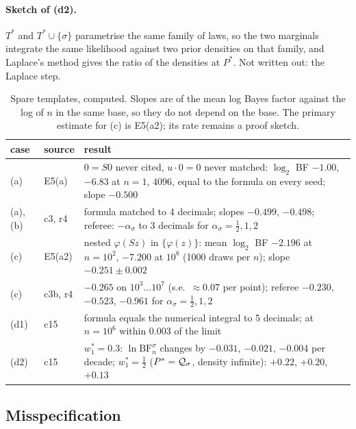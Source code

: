 \paragraph{Sketch of (d2).} $T^*$ and $T^*\cup\{\sigma\}$ parametrise the same family of laws, so the two marginals integrate the same likelihood against two prior densities on that family, and Laplace's method gives the ratio of the densities at $P^*$. Not written out: the Laplace step.

\begin{table}[ht]
\centering\small
\begin{tabular}{@{}llp{10.4cm}@{}}
\toprule
case & source & result\\
\midrule
(a) & E5(a) & $0=S0$ never cited, $u\cdot0=0$ never matched: $\log_2$ BF $-1.00$, $-6.83$ at $n=1$, $4096$, equal to the formula on every seed; slope $-0.500$\\
(a), (b) & c3, r4 & formula matched to 4 decimals; slopes $-0.499$, $-0.498$; referee: $-\alpha_\sigma$ to 3 decimals for $\alpha_\sigma=\frac12,1,2$\\
(c) & E5(a2) & nested $\varphi(Sz)$ in $\{\varphi(z)\}$: mean $\log_2$ BF $-2.196$ at $n=10^2$, $-7.200$ at $10^8$ (1000 draws per $n$); slope $-0.251\pm0.002$\\
(c) & c3b, r4 & $-0.265$ on $10^3\ldots10^7$ (s.e.\ $\approx0.07$ per point); referee $-0.230$, $-0.523$, $-0.961$ for $\alpha_\sigma=\frac12,1,2$\\
(d1) & c15 & formula equals the numerical integral to 5 decimals; at $n=10^6$ within $0.003$ of the limit\\
(d2) & c15 & $w^*_1=0.3$: $\ln\mathrm{BF}^\sigma_n$ changes by $-0.031$, $-0.021$, $-0.004$ per decade; $w^*_1=\frac12$ ($P^*=\mathcal{Q}_\sigma$, density infinite): $+0.22$, $+0.20$, $+0.13$\\
\bottomrule
\end{tabular}
\caption{Spare templates, computed. Slopes are of the mean log Bayes factor against the log of $n$ in the same base, so they do not depend on the base. The primary estimate for (c) is E5(a2); its rate remains a proof sketch.}
\label{tab:ident:spare}
\end{table}

\subsection{Misspecification}\label{app:ident:misspec}

